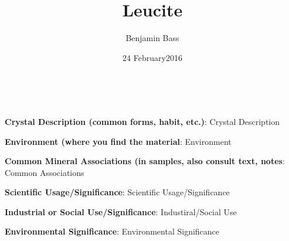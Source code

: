 \documentclass[10pt]{article}
\author{Benjamin Bass}
\date{24 February2016}
\title{\vspace{-2.0cm}Leucite} %
\begin{document}
\maketitle


\
\
\
\
\
\
\
\
\
\

\begin{framed}
  \textbf{Crystal Description (common forms, habit, etc.)}:  Crystal Description
\end{framed}

\begin{framed}
  \textbf{Environment (where you find the material}:  Environment
\end{framed}

\begin{framed}
  \textbf{Common Mineral Associations (in samples, also consult text, notes}:  Common Associations
\end{framed}

\begin{framed}
  \textbf{Scientific Usage/Significance}:  Scientific Usage/Significance
\end{framed}

\begin{framed}
  \textbf{Industrial or Social Use/Significance}:  Industiral/Social Use
\end{framed}

\begin{framed}
  \textbf{Environmental Significance}:  Environmental Significance
\end{framed}


\end{document}
